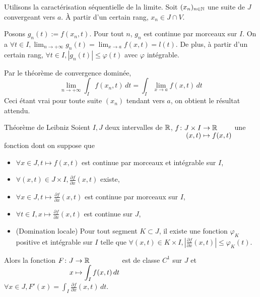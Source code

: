 \documentclass[a4paper, 12pt]{article}
\begin{document}
\begin{demonstration}
    Utilisons la caractérisation séquentielle de la limite.
    Soit $(x_n)_{n \in \mathbb{N}}$ une suite de $J$ convergeant vers $a$. À partir d'un certain rang, $x_n \in J \cap V$.
    
    Posons $g_n(t) := f(x_n, t)$.
    Pour tout $n$, $g_n$ est continue par morceaux sur $I$.
    On a $\forall t \in I, \lim_{n \to +\infty} g_n(t) = \lim_{x \to a} f(x, t) = l(t)$.
    De plus, à partir d'un certain rang, $\forall t \in I, |g_n(t)| \leq \varphi(t)$ avec $\varphi$ intégrable.
    
    Par le théorème de convergence dominée,
    $$
    \lim_{n \to +\infty} \int_I f(x_n, t) \, dt = \int_I \lim_{x \to a} f(x, t) \, dt
    $$
    Ceci étant vrai pour toute suite $(x_n)$ tendant vers $a$, on obtient le résultat attendu.
\end{demonstration}

\begin{theoreme}{Théorème de Leibniz}{}
    Soient $I, J$ deux intervalles de $\mathbb{R}$, $\funcdef{f}{J \times I}{\R}{(x, t)}{f(x, t)}$ une fonction dont on suppose que 

    \begin{itemize}
        \item $\forall x \in J, t \mapsto f(x, t)$ est continue par morceaux et intégrable sur $I$,
        \item $\forall (x, t) \in J \times I, \frac{\partial f}{\partial x}(x, t)$ existe,
        \item $\forall x \in J, t \mapsto \frac{\partial f}{\partial x}(x, t)$ est continue par morceaux sur $I$,
        \item $\forall t \in I, x \mapsto \frac{\partial f}{\partial x}(x, t)$ est continue sur $J$,
        \item (Domination locale) Pour tout segment $K \subset J$, il existe une fonction $\varphi_K$ positive et intégrable sur $I$ telle que $\forall (x, t) \in K \times I, \left| \frac{\partial f}{\partial x}(x, t) \right| \leq \varphi_K(t)$.
    \end{itemize}
    Alors la fonction $\funcdef{F}{J}{\R}{x}{\int_I f(x, t) \, dt}$ est de classe $C^1$ sur $J$ et $\forall x \in J, F'(x) = \int_I \frac{\partial f}{\partial x}(x, t) \, dt$.
\end{theoreme}
\end{document}
